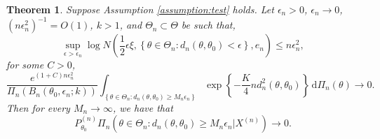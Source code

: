 \documentclass[11pt]{article}
\theoremstyle{plain}
\newtheorem{theorem}{\quad\quad Theorem}
\theoremstyle{definition}
\theoremstyle{remark}
\begin{document}
\begin{theorem}
    Suppose Assumption \ref{assumption:test} holds.
    Let $\epsilon_n >0$, $\epsilon_n \to 0$, $(n \epsilon_n^2)^{-1} =  O (1)$, $k > 1$, and $\Theta_n \subset \Theta$ be such that,
    \begin{equation}\label{condition:1}
        \sup_{\epsilon>\epsilon_n} \log N \left( \frac{1}{2} \epsilon \xi, \left\{ \theta \in \Theta_n : d_n \left( \theta, \theta_0 \right) < \epsilon \right\}, e_n \right)
        \leq n \epsilon_n^2,
    \end{equation}
    for some $C>0$,
    \begin{equation}\label{condition:2}
        \frac{
e^{(1+C) n \epsilon_n^2} 
        }{
\Pi_n \left( B_n \left( \theta_0, \epsilon_n ; k \right) \right)
        }  
        \int_{
            \left\{ \theta \in \Theta_n :  d_n (\theta, \theta_0) \geq M_n \epsilon_n  \right\}
        } 
            \exp \left\{-\frac{K}{4}n d_n^2(\theta,\theta_0) \right\}
            \, \mathrm d \Pi_n \left( \theta \right) \to 0.
    \end{equation}
    Then for every $M_n \to \infty$, we have that
    \begin{equation*}
        P_{\theta_0}^{(n)} \Pi_n \left( \theta \in \Theta_n : d_n (\theta, \theta_0) \geq M_n \epsilon_n | X^{(n)} \right) \to 0. 
    \end{equation*}
    \label{theorem:consistency}
\end{theorem}
\end{document}
